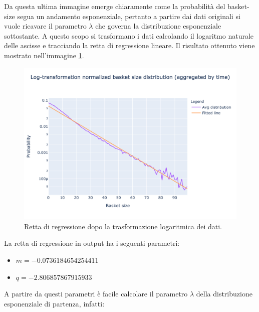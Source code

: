 Da questa ultima immagine emerge chiaramente come la probabilità del basket-size segua un andamento esponenziale, pertanto a partire dai dati originali si vuole ricavare il parametro $\lambda$ che governa la distribuzione esponenziale sottostante. A questo scopo si trasformano i dati calcolando il logaritmo naturale delle ascisse e tracciando la retta di regressione lineare. Il risultato ottenuto viene mostrato nell'immagine \ref{fig:regression_log}.

\begin{figure}[H]
	\centering
	\includegraphics[width=14cm]{"images/basket_size_log.png"}
	\caption{Retta di regressione dopo la trasformazione logaritmica dei dati.}
	\label{fig:regression_log}
\end{figure}

La retta di regressione in output ha i seguenti parametri:
\begin{itemize}
	\item $m = -0.0736184654254411$
	\item $q = -2.806857867915933$
\end{itemize}
A partire da questi parametri è facile calcolare il parametro $\lambda$ della distribuzione esponenziale di partenza, infatti:

